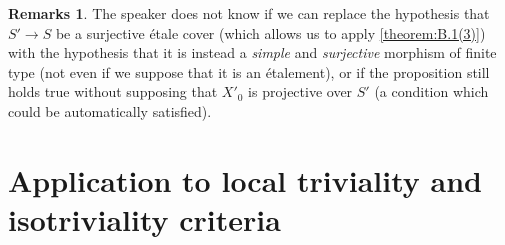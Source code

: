 \documentclass{article}
\theoremstyle{plain}
\theoremstyle{definition}
\newtheorem*{remarks*}{Remarks}
\begin{document}
\begin{remarks*}
  The speaker does not know if we can replace the hypothesis that $S'\to S$ be a surjective \'{e}tale cover (which allows us to apply \cref{theorem:B.1(3)}) with the hypothesis that it is instead a \emph{simple} and \emph{surjective} morphism of finite type (not even if we suppose that it is an \'{e}talement), or if the proposition still holds true without supposing that $X'_0$ is projective over $S'$ (a condition which could be automatically satisfied).
\end{remarks*}


\section{Application to local triviality and isotriviality criteria}
\label{B.6}
\end{document}
